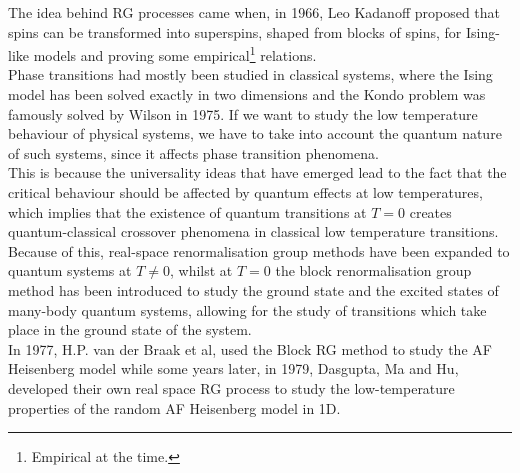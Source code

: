 \documentclass[../rsrg.tex,../../main.tex]{subfiles}
\begin{document}
The idea behind RG processes came when, in 1966, Leo Kadanoff\cite{kadanoff} proposed that spins can be transformed into superspins, shaped from blocks of spins, for Ising-like models and proving some empirical\footnote{Empirical at the time.} relations.\\


Phase transitions had mostly been studied in classical systems, where the Ising model has been solved exactly in two dimensions\cite{onsager} and the Kondo problem was famously solved by Wilson in 1975\cite{wilson}. If we want to study the low temperature behaviour of physical systems, we have to take into account the quantum nature of such systems, since it affects phase transition phenomena.\\

This is because the universality ideas that have emerged lead to the fact that the critical behaviour should be affected by quantum effects at low temperatures, which implies that the existence of quantum transitions at $T=0$ creates quantum-classical crossover phenomena in classical low temperature transitions. Because of this, real-space renormalisation group methods have been expanded to quantum systems at $T\ne0$, whilst at $T=0$ the block renormalisation group method has been introduced to study the ground state and the excited states of many-body quantum systems, allowing for the study of transitions which take place in the ground state of the system.\\

In 1977, H.P. van der Braak et al\cite{braak}, used the Block RG method to study the AF Heisenberg model while some years later, in 1979, Dasgupta, Ma and Hu\cite{dasgupta-hu, ma}, developed their own real space RG process to study the low-temperature properties of the random AF Heisenberg model in 1D. 
\end{document}
